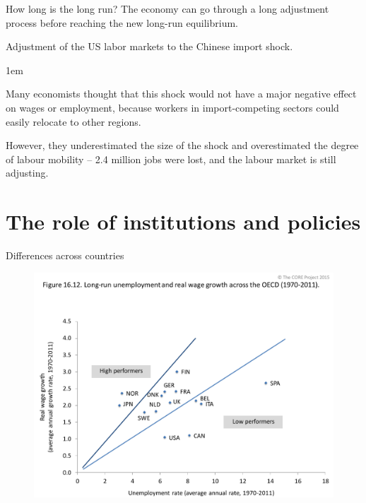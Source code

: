 \documentclass[11pt,aspectratio=43,usenames,dvipsnames]{beamer}
\let\olditemize=\itemize
\let\endolditemize=\enditemize
\renewenvironment{itemize}{\olditemize \itemsep1em}{\endolditemize}
\theoremstyle{definition}
\begin{document}
\begin{frame}{How long is the long run?}
\label{slide:How_long_is_the_long_run_}
    The economy can go through a long adjustment process before reaching the new long-run equilibrium.
    \begin{example}
        Adjustment of the US labor markets to the Chinese import shock.
    \end{example}
    \begin{itemize}
        \item Many economists thought that this shock would not have a major negative effect on wages or employment, because workers in import-competing sectors could easily relocate to other regions.
        \item However, they underestimated the size of the shock and overestimated the degree of labour mobility – 2.4 million jobs were lost, and the labour market is still adjusting.
    \end{itemize}

\end{frame}

\section[Policy]{The role of institutions and policies}
\label{sec:_The_role_of_institutions_and_policies}

\begin{frame}{Differences across countries}
\label{slide:Differences_across_countries}
    \begin{figure}
        \centering
        \includegraphics[width=.9\textwidth]{./figures/14.pdf}
    \end{figure}

\end{frame}
\end{document}
